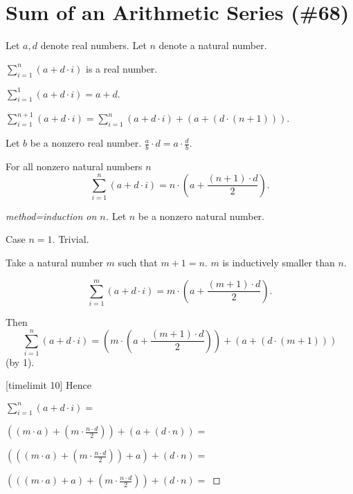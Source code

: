 \documentclass{article}
\begin{document}
\section{Sum of an Arithmetic Series (\#68)}

\newcommand{\sumarith}[3]{\sum_{i = 1}^{#3}(#1 + #2 \cdot i)}

\begin{forthel}
Let $a,d$ denote real numbers.
Let $n$ denote a natural number.

\begin{signature}
$\sumarith{a}{d}{n}$ is a real number.
\end{signature}

\begin{axiom}
$\sumarith{a}{d}{1} = a + d$.
\end{axiom}

\begin{axiom}[title=1]
$\sumarith{a}{d}{n+1} = \sumarith{a}{d}{n} + (a + (d \cdot (n + 1)))$.
\end{axiom}

\begin{lemma}
Let $b$ be a nonzero real number.
$\frac{a}{b} \cdot d = a \cdot \frac{d}{b}$.
\end{lemma}

\begin{theorem} For all nonzero natural numbers $n$
$$\sumarith{a}{d}{n} = n \cdot ( a + \frac{(n + 1) \cdot d}{2}).$$
\end{theorem}
\begin{proof}[method=induction on $n$]
Let $n$ be a nonzero natural number.

Case $n = 1$.
Trivial.

Take a natural number $m$ such that $m + 1 = n$. $m$ is inductively smaller than $n$.

$$\sumarith{a}{d}{m} = m \cdot ( a + \frac{(m + 1) \cdot d}{2}).$$

Then
$$\sumarith{a}{d}{n} =
(m \cdot ( a + \frac{(m + 1) \cdot d}{2})) + (a + (d \cdot (m + 1)))$$
(by 1).


[timelimit 10]
Hence

$\sumarith{a}{d}{n} =$

$((m \cdot a) + (m \cdot \frac{n \cdot d}{2})) + (a + (d \cdot n)) =$

$(((m \cdot a) + (m \cdot \frac{n \cdot d}{2})) + a) + (d \cdot n) =$

$(((m \cdot a) + a) +  (m \cdot \frac{n \cdot d}{2})) + (d \cdot n) =$


\end{proof}
\end{forthel}
\end{document}
